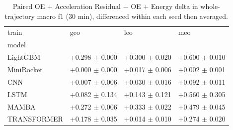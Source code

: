 \begin{table}
\caption{Paired OE + Acceleration Residual $-$ OE + Energy delta in whole-trajectory macro f1 (30 min), differenced within each seed then averaged.}
\label{tab:total_featdelta_f1_ladder}
\begin{tabular}{llll}
\toprule
train & geo & leo & meo \\
model &  &  &  \\
\midrule
LightGBM & +0.298 $\pm$ 0.000 & +0.300 $\pm$ 0.020 & +0.600 $\pm$ 0.010 \\
MiniRocket & +0.000 $\pm$ 0.000 & +0.017 $\pm$ 0.006 & +0.002 $\pm$ 0.001 \\
CNN & +0.007 $\pm$ 0.006 & +0.030 $\pm$ 0.016 & +0.092 $\pm$ 0.011 \\
LSTM & +0.082 $\pm$ 0.134 & +0.143 $\pm$ 0.121 & +0.560 $\pm$ 0.305 \\
MAMBA & +0.272 $\pm$ 0.006 & +0.333 $\pm$ 0.022 & +0.479 $\pm$ 0.045 \\
TRANSFORMER & +0.178 $\pm$ 0.035 & +0.014 $\pm$ 0.010 & +0.274 $\pm$ 0.020 \\
\bottomrule
\end{tabular}
\end{table}
